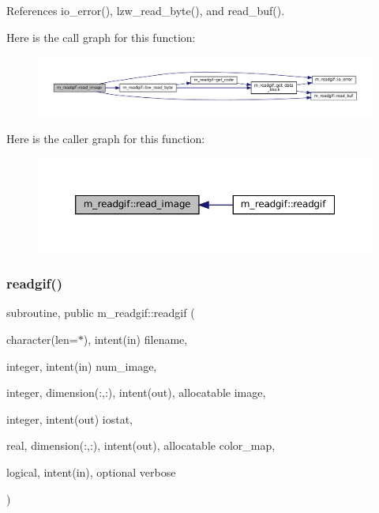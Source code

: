 References io\+\_\+error(), lzw\+\_\+read\+\_\+byte(), and read\+\_\+buf().

Here is the call graph for this function\+:
\nopagebreak
\begin{figure}[H]
\begin{center}
\leavevmode
\includegraphics[width=350pt]{namespacem__readgif_a4af978d944dbefb3ddeb81cd8c54d0f9_cgraph}
\end{center}
\end{figure}
Here is the caller graph for this function\+:
\nopagebreak
\begin{figure}[H]
\begin{center}
\leavevmode
\includegraphics[width=350pt]{namespacem__readgif_a4af978d944dbefb3ddeb81cd8c54d0f9_icgraph}
\end{center}
\end{figure}
\mbox{\label{namespacem__readgif_a775e2da2a9f54ec308e87a339a393ed6}} 
\subsubsection{\texorpdfstring{readgif()}{readgif()}}
{\footnotesize\ttfamily subroutine, public m\+\_\+readgif\+::readgif (\begin{DoxyParamCaption}\item[{character(len=$\ast$), intent(in)}]{filename,  }\item[{integer, intent(in)}]{num\+\_\+image,  }\item[{integer, dimension(\+:,\+:), intent(out), allocatable}]{image,  }\item[{integer, intent(out)}]{iostat,  }\item[{real, dimension(\+:,\+:), intent(out), allocatable}]{color\+\_\+map,  }\item[{logical, intent(in), optional}]{verbose }\end{DoxyParamCaption})}



